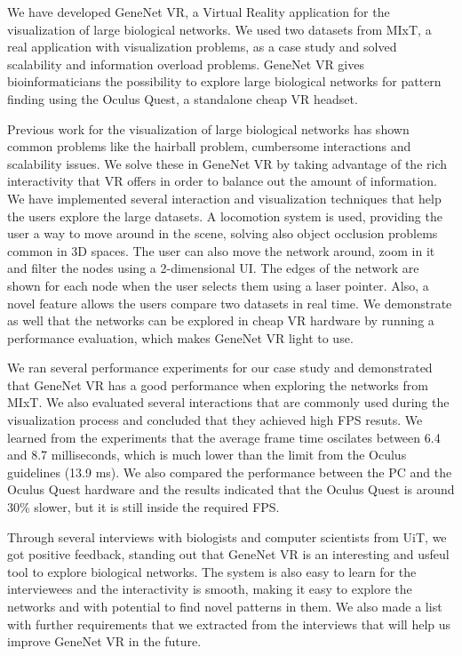 We have developed GeneNet VR, a Virtual Reality application for the visualization of large biological networks. We used two datasets from MIxT, a real application with visualization problems, as a case study and solved scalability and information overload problems. GeneNet VR gives bioinformaticians the possibility to explore large biological networks for pattern finding using the Oculus Quest, a standalone cheap VR headset.

Previous work for the visualization of large biological networks has shown common problems like the hairball problem, cumbersome interactions and scalability issues. We solve these in GeneNet VR by taking advantage of the rich interactivity that VR offers in order to balance out the amount of information. We have implemented several interaction and visualization techniques that help the users explore the large datasets. A locomotion system is used, providing the user a way to move around in the scene, solving also object occlusion problems common in 3D spaces. The user can also move the network around, zoom in it and filter the nodes using a 2-dimensional UI. The edges of the network are shown for each node when the user selects them using a laser pointer. Also, a novel feature allows the users compare two datasets in real time. We demonstrate as well that the networks can be explored in cheap VR hardware by running a performance evaluation, which makes GeneNet VR light to use.

We ran several performance experiments for our case study and demonstrated that GeneNet VR has a good performance when exploring the networks from MIxT. We also evaluated several interactions that are commonly used during the visualization process and concluded that they achieved high FPS resuts. We learned from the experiments that the average frame time oscilates between 6.4 and 8.7 milliseconds, which is much lower than the limit from the Oculus guidelines (13.9 ms). We also compared the performance between the PC and the Oculus Quest hardware and the results indicated that the Oculus Quest is around 30\% slower, but it is still inside the required FPS.

Through several interviews with biologists and computer scientists from UiT, we got positive feedback, standing out that GeneNet VR is an interesting and usfeul tool to explore biological networks. The system is also easy to learn for the interviewees and the interactivity is smooth, making it easy to explore the networks and with potential to find novel patterns in them. We also made a list with further requirements that we extracted from the interviews that will help us improve GeneNet VR in the future.

